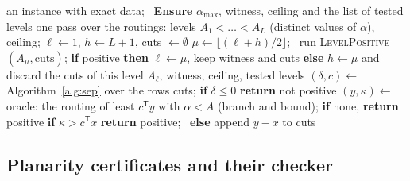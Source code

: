 \documentclass[11pt]{article}
\theoremstyle{remark}
\begin{document}
\begin{algorithm}[t]
\caption{Cutting-plane evaluator of the frontier value: streaming levels, binary search over them and a loop of separation programs and an exact oracle at each level.}
\label{alg:cp}
\begin{algorithmic}[1]
\Require an instance with exact data; \ \textbf{Ensure} $\alpha_{\max}$, witness, ceiling and the list of tested levels
\State one pass over the routings: levels $A_1<\dots<A_L$ (distinct values of $\alpha$), ceiling; $\ell\gets1$, $h\gets L+1$, cuts $\gets\emptyset$ 
  \State $\mu\gets\lfloor(\ell+h)/2\rfloor$; \ run \textsc{LevelPositive}$(A_\mu,\text{cuts})$; \textbf{if} positive \textbf{then} $\ell\gets\mu$, keep witness and cuts \textbf{else} $h\gets\mu$ and discard the cuts of this level
\EndWhile
\State \Return $A_\ell$, witness, ceiling, tested levels
\Statex
{}
  \Loop
    \State $(\delta,c)\gets$ Algorithm~\ref{alg:sep} over the rows cuts; \textbf{if} $\delta\le0$ \textbf{return} not positive
    \State $(y,\kappa)\gets$ oracle: the routing of least $c^{\mathsf T}y$ with $\alpha<A$ (branch and bound); \textbf{if} none, \textbf{return} positive
    \State \textbf{if} $\kappa>c^{\mathsf T}x$ \textbf{return} positive; \ \textbf{else} append $y-x$ to cuts
  \EndLoop
\EndFunction
\end{algorithmic}
\end{algorithm}

\subsection{Planarity certificates and their checker}
\label{sec:planar}
\end{document}

